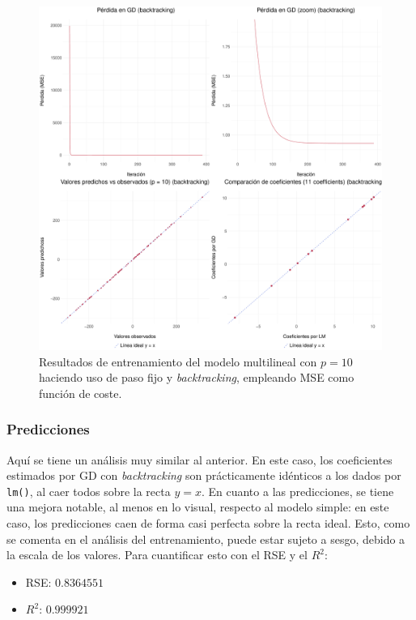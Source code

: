 \documentclass[11pt]{opticajnl}
\begin{document}
\begin{figure}[H]
\centering
\includegraphics[width=\textwidth]{fotos/plot_multi.pdf}
\caption{Resultados de entrenamiento del modelo multilineal con $p=10$ haciendo uso de paso fijo y \textit{backtracking}, empleando MSE como función de coste.}
\label{fig:2}
\end{figure}

\subsubsection{Predicciones}

Aquí se tiene un análisis muy similar al anterior. En este caso, los coeficientes estimados por GD con \textit{backtracking} son prácticamente idénticos a los dados por \texttt{lm()}, al caer todos sobre la recta $y=x$. En cuanto a las predicciones, se tiene una mejora notable, al menos en lo visual, respecto al modelo simple: en este caso, los predicciones caen de forma casi perfecta sobre la recta ideal. Esto, como se comenta en el análisis del entrenamiento, puede estar sujeto a sesgo, debido a la escala de los valores. Para cuantificar esto con el RSE y el $R^2$:
\begin{multicols}{2}
\begin{itemize}
\item RSE: $0.8364551$ 
\item $R^2$: $0.999921$ 
\end{itemize}
\end{multicols}
\end{document}
